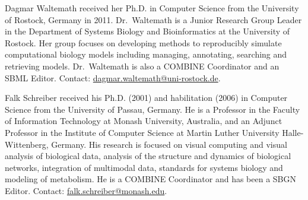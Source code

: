 \documentclass[journal,transmag]{IEEEtran}
\begin{document}
\ifCLASSOPTIONcaptionsoff
  \newpage
\fi




% 

\begin{IEEEbiography}{Dagmar Waltemath}
received her Ph.D. in Computer Science from the University of Rostock, Germany in 2011. 
Dr.~Waltemath is a Junior Research Group Leader in the Department of Systems Biology and Bioinformatics at the University of Rostock. 
Her group focuses on developing methods to reproducibly simulate computational biology models including managing, annotating, searching and retrieving models.
Dr.~Waltemath is also a COMBINE Coordinator and an SBML Editor. 
Contact: \href{mailto:dagmar.waltemath@uni-rostock.de}{dagmar.waltemath@uni-rostock.de}.
\end{IEEEbiography}

\begin{IEEEbiography}{Falk Schreiber} 
received his Ph.D. (2001) and habilitation (2006) in Computer Science from the University of Passau, Germany. 
He is a Professor in the Faculty of Information Technology at Monash University, Australia, and an Adjunct Professor in the Institute of Computer Science at Martin Luther University Halle-Wittenberg, Germany. 
His research is focused on visual computing and visual analysis of biological data, analysis of the structure and dynamics of biological networks, integration of multimodal data,  standards for systems biology and modeling of metabolism. 
He is a COMBINE Coordinator and has been a SBGN Editor.
Contact: \href{mailto:falk.schreiber@monash.edu}{falk.schreiber@monash.edu}.
\end{IEEEbiography}
\end{document}
